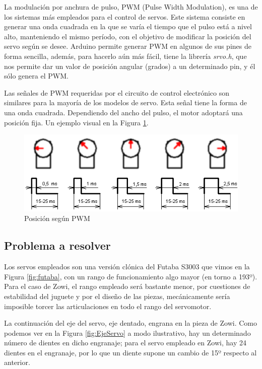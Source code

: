 La modulación por anchura de pulso, PWM (Pulse Width Modulation), es una de los sistemas más empleados para el control de servos. Este sistema consiste en generar una onda cuadrada en la que se varía el tiempo que el pulso está a nivel alto, manteniendo el mismo período, con el objetivo de modificar la posición del servo según se desee. Arduino permite generar PWM en algunos de sus pines de forma sencilla, además, para hacerlo aún más fácil, tiene la librería \textit{srvo.h}, que nos permite dar un valor de posición angular (grados) a un determinado pin, y él sólo genera el PWM.

Las señales de PWM requeridas por el circuito de control electrónico son similares para la mayoría de los modelos de servo. Esta señal tiene la forma de una onda cuadrada. Dependiendo del ancho del pulso, el motor adoptará una posición fija. Un ejemplo visual en la Figura \ref{fig:ServoPWM}.

\begin{figure}[h]
\centering
\includegraphics[width=140mm]{Figures/servo-pwm.png}
\caption[Posición según PWM]{Posición según PWM}
\label{fig:ServoPWM}
\end{figure}

\subsection{Problema a resolver}
Los servos empleados son una versión clónica del Futaba S3003 que vimos en la Figura \ref{fig:futaba}, con un rango de funcionamiento algo mayor (en torno a 193º). Para el caso de Zowi, el rango empleado será bastante menor, por cuestiones de estabilidad del juguete y por el diseño de las piezas, mecánicamente sería imposible torcer las articulaciones en todo el rango del servomotor.

La continuación del eje del servo, eje dentado, engrana en la pieza de Zowi. Como podemos ver en la Figura \ref{fig:EjeServo} a modo ilustrativo, hay un determinado número de dientes en dicho engranaje; para el servo empleado en Zowi, hay 24 dientes en el engranaje, por lo que un diente supone un cambio de 15º respecto al anterior.

